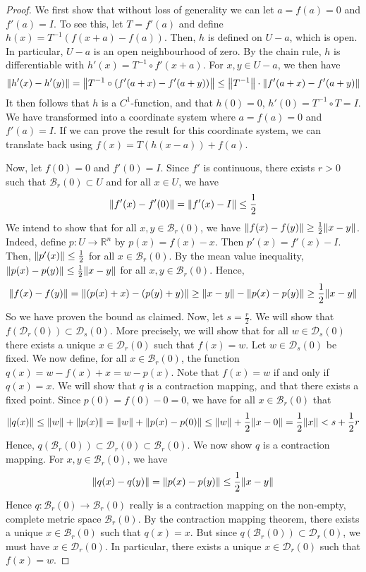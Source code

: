 \begin{proof}
	We first show that without loss of generality we can let \( a = f(a) = 0 \) and \( f'(a) = I \).
	To see this, let \( T = f'(a) \) and define \( h(x) = T^{-1}(f(x+a) - f(a)) \).
	Then, \( h \) is defined on \( U - a \), which is open.
	In particular, \( U - a \) is an open neighbourhood of zero.
	By the chain rule, \( h \) is differentiable with \( h'(x) = T^{-1} \circ f'(x+a) \).
	For \( x, y \in U - a \), we then have
	\[
		\norm{h'(x) - h'(y)} = \norm{T^{-1} \circ (f'(a+x) - f'(a+y))} \leq \norm{T^{-1}} \cdot \norm{f'(a+x) - f'(a+y)}
	\]
	It then follows that \( h \) is a \( C^1 \)-function, and that \( h(0) = 0 \), \( h'(0) = T^{-1} \circ T = I \).
	We have transformed into a coordinate system where \( a = f(a) = 0 \) and \( f'(a) = I \).
	If we can prove the result for this coordinate system, we can translate back using \( f(x) = T(h(x-a)) + f(a) \).

	Now, let \( f(0) = 0 \) and \( f'(0) = I \).
	Since \( f' \) is continuous, there exists \( r > 0 \) such that \( \mathcal B_r(0) \subset U \) and for all \( x \in U \), we have
	\[
		\norm{f'(x) - f'(0)} = \norm{f'(x) - I} \leq \frac{1}{2}
	\]
	We intend to show that for all \( x,y \in \mathcal B_r(0) \), we have \( \norm{f(x) - f(y)} \geq \frac{1}{2} \norm{x-y} \).
	Indeed, define \( p \colon U \to \mathbb R^n \) by \( p(x) = f(x) - x \).
	Then \( p'(x) = f'(x) - I \).
	Then, \( \norm{p'(x)} \leq \frac{1}{2} \) for all \( x \in \mathcal B_r(0) \).
	By the mean value inequality, \( \norm{p(x) - p(y)} \leq \frac{1}{2}\norm{x-y} \) for all \( x, y \in \mathcal B_r(0) \).
	Hence,
	\[
		\norm{f(x) - f(y)} = \norm{(p(x) + x) - (p(y) + y)} \geq \norm{x-y} - \norm{p(x) - p(y)} \geq \frac{1}{2} \norm{x-y}
	\]
	So we have proven the bound as claimed.
	Now, let \( s = \frac{r}{2} \).
	We will show that \( f(\mathcal D_r(0)) \subset \mathcal D_s(0) \).
	More precisely, we will show that for all \( w \in \mathcal D_s(0) \) there exists a unique \( x \in \mathcal D_r(0) \) such that \( f(x) = w \).
	Let \( w \in \mathcal D_s(0) \) be fixed.
	We now define, for all \( x \in \mathcal B_r(0) \), the function \( q(x) = w - f(x) + x = w - p(x) \).
	Note that \( f(x) = w \) if and only if \( q(x) = x \).
	We will show that \( q \) is a contraction mapping, and that there exists a fixed point.
	Since \( p(0) = f(0) - 0 = 0 \), we have for all \( x \in \mathcal B_r(0) \) that
	\[
		\norm{q(x)} \leq \norm{w} + \norm{p(x)} = \norm{w} + \norm{p(x) - p(0)} \leq \norm{w} + \frac{1}{2} \norm{x-0} = \frac{1}{2} \norm{x} < s + \frac{1}{2} r
	\]
	Hence, \( q(\mathcal B_r(0)) \subset \mathcal D_r(0) \subset \mathcal B_r(0) \).
	We now show \( q \) is a contraction mapping.
	For \( x,y \in \mathcal B_r(0) \), we have
	\[
		\norm{q(x) - q(y)} = \norm{p(x) - p(y)} \leq \frac{1}{2} \norm{x-y}
	\]
	Hence \( q \colon \mathcal B_r(0) \to \mathcal B_r(0) \) really is a contraction mapping on the non-empty, complete metric space \( \mathcal B_r(0) \).
	By the contraction mapping theorem, there exists a unique \( x \in \mathcal B_r(0) \) such that \( q(x) = x \).
	But since \( q(\mathcal B_r(0)) \subset \mathcal D_r(0) \), we must have \( x \in \mathcal D_r(0) \).
	In particular, there exists a unique \( x \in \mathcal D_r(0) \) such that \( f(x) = w \).


\end{proof}
